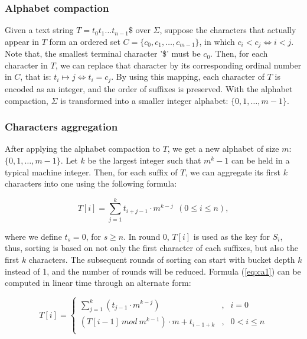 \documentclass{ws-ijprai}
\begin{document}
\subsubsection{Alphabet compaction}

Given a text string $T = t_0t_1...t_{n-1}\$$ over $\Sigma$, suppose
the characters that actually appear in $T$ form an ordered set $C =
\{c_0, c_1,\dots, c_{m-1}\}$, in which $c_i < c_j \iff i < j$. Note
that, the smallest terminal character '\$' must be $c_0$.  Then, for
each character in $T$, we can replace that character by its
corresponding ordinal number in $C$, that is: $t_i \mapsto j \iff t_i
= c_j$.  By using this mapping, each character of $T$ is encoded as an
integer, and the order of suffixes is preserved. With the alphabet
compaction, $\Sigma$ is transformed into a smaller integer alphabet:
$\{0,1,\dots,m-1\}$.

\subsubsection{Characters aggregation}

After applying the alphabet compaction to $T$, we get a new alphabet
of size $m$: $\{0,1,\dots,m-1\}$. Let $k$ be the largest integer such
that $m^k-1$ can be held in a typical machine integer. Then, for each
suffix of $T$, we can aggregate its first $k$ characters into one
using the following formula:

\begin{equation}\label{eq:ca1}
  T[i] = \sum_{j=1}^k t_{i+j-1} \cdot m^{k-j}  ~~(0 \leq i \leq n),
\end{equation}

\noindent where we define $t_s = 0$, for $s \geq n$.  In round 0,
$T[i]$ is used as the key for $S_i$, thus, sorting is based on not
only the first character of each suffixes, but also the first $k$
characters. The subsequent rounds of sorting can start with bucket
depth $k$ instead of 1, and the number of rounds will be
reduced. Formula (\ref{eq:ca1}) can be computed in linear time through
an alternate form:

\begin{equation}\label{eq:ca2}
 T[i]  = \left\{
  \begin{array}{lll}
    \sum_{j=1}^{k}(t_{j-1} \cdot m^{k-j})  &,  &  i = 0\\
    (T[i-1]~ mod~m^{k-1}) \cdot m + t_{i-1+k} &,  & 0 < i \leq n \\
    \end{array}\right.
\end{equation}
\end{document}
